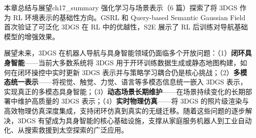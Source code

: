 \begin{futurebox}{本章总结与展望}{ch17_summary}
强化学习与场景表示（6 篇）探索了将 3DGS 作为 RL 环境表示的基础性方向。GSRL 和 Query-based Semantic Gaussian Field 首次验证了可泛化 3DGS 在 RL 中的优越性，S2E 展示了 RL 后训练对导航基础模型的增强效果。

展望未来，3DGS 在机器人导航与具身智能领域仍面临多个开放问题：（1）\textbf{闭环具身智能}——当前大多数系统将 3DGS 用于开环训练数据生成或静态地图构建，如何在闭环操控中实时更新 3DGS 表示并与策略学习耦合仍是核心挑战；（2）\textbf{多模态统一表示}——将视觉、触觉、力觉、语言等多模态信息统一嵌入 3DGS 表示，实现真正的多模态具身智能；（3）\textbf{动态场景长期维护}——在场景持续变化的长期部署中维护高质量的 3DGS 表示；（4）\textbf{实时物理仿真}——将 3DGS 的照片级渲染与高效物理仿真深度集成，支持闭环仿真到真实的无缝迁移。随着这些问题的逐步解决，3DGS 有望成为具身智能的核心基础设施，支撑从家庭服务机器人到工业自动化、从搜索救援到太空探索的广泛应用。
\end{futurebox}
